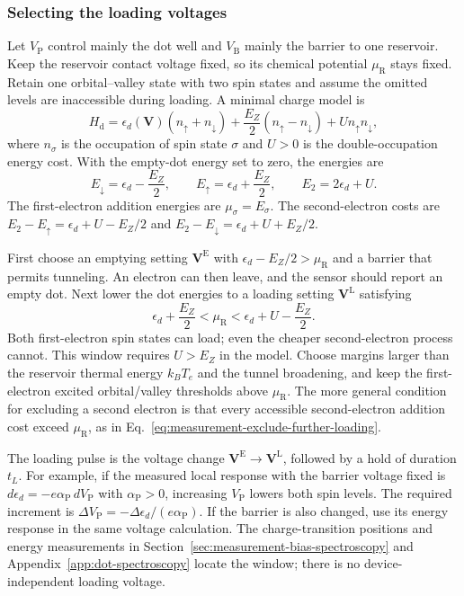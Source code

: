 \subsubsection{Selecting the loading voltages}
Let $V_{\mathrm P}$ control mainly the dot well and $V_{\mathrm B}$
mainly the barrier to one reservoir. Keep the reservoir contact
voltage fixed, so its chemical potential $\mu_{\mathrm R}$ stays
fixed. Retain one orbital--valley state with two spin states and
assume the omitted levels are inaccessible during loading.
A minimal charge model is
\[
 H_{\mathrm d}
 =\epsilon_d(\mathbf V)(n_\uparrow+n_\downarrow)
   +\frac{E_Z}{2}(n_\uparrow-n_\downarrow)
   +U n_\uparrow n_\downarrow ,
\]
where $n_\sigma$ is the occupation of spin state $\sigma$ and
$U>0$ is the double-occupation energy cost. With the empty-dot
energy set to zero, the energies are
\[
 E_\downarrow=\epsilon_d-\frac{E_Z}{2},\qquad
 E_\uparrow=\epsilon_d+\frac{E_Z}{2},\qquad
 E_2=2\epsilon_d+U.
\]
The first-electron addition energies are
$\mu_\sigma=E_\sigma$. The second-electron costs are
$E_2-E_\uparrow=\epsilon_d+U-E_Z/2$ and
$E_2-E_\downarrow=\epsilon_d+U+E_Z/2$.

First choose an emptying setting $\mathbf V^{\mathrm E}$ with
$\epsilon_d-E_Z/2>\mu_{\mathrm R}$ and a barrier that permits
tunneling. An electron can then leave, and the sensor should report
an empty dot. Next lower the dot energies to a loading setting
$\mathbf V^{\mathrm L}$ satisfying
\begin{equation}
 \epsilon_d+\frac{E_Z}{2}<\mu_{\mathrm R}
       <\epsilon_d+U-\frac{E_Z}{2}.
 \label{eq:calibration-loading-window}
\end{equation}
Both first-electron spin states can load; even the cheaper
second-electron process cannot. This window requires $U>E_Z$ in
the model. Choose margins larger than the reservoir thermal energy
$k_BT_e$ and the tunnel broadening, and keep the first-electron
excited orbital/valley thresholds above $\mu_{\mathrm R}$.
The more general condition for excluding a second electron is
that every accessible second-electron addition cost exceed
$\mu_{\mathrm R}$, as in
Eq.~\eqref{eq:measurement-exclude-further-loading}.

The loading pulse is the voltage change
$\mathbf V^{\mathrm E}\to\mathbf V^{\mathrm L}$, followed by a
hold of duration $t_L$. For example, if the measured local response
with the barrier voltage fixed is
$d\epsilon_d=-e\alpha_{\mathrm P}\,dV_{\mathrm P}$ with
$\alpha_{\mathrm P}>0$, increasing $V_{\mathrm P}$ lowers both spin
levels. The required increment is
$\Delta V_{\mathrm P}=-\Delta\epsilon_d/(e\alpha_{\mathrm P})$.
If the barrier is also changed, use its energy response in the
same voltage calculation. The charge-transition positions and
energy measurements in Section~\ref{sec:measurement-bias-spectroscopy}
and Appendix~\ref{app:dot-spectroscopy} locate the window; there is no device-independent loading voltage.

